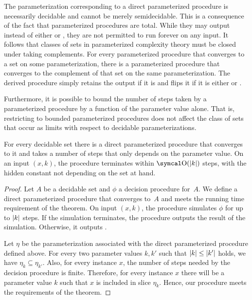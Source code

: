 The parameterization corresponding to a direct parameterized procedure is necessarily decidable and cannot be merely semidecidable.
This is a consequence of the fact that parameterized procedures are total.
While they may output  instead of either  or , they are not permitted to run forever on any input.
It follows that classes of sets in parameterized complexity theory must be closed under taking complements.
For every parameterized procedure that converges to a set on some parameterization, there is a parameterized procedure that converges to the complement of that set on the same parameterization.
The derived procedure simply retains the output if it is  and flips it if it is either  or .

Furthermore, it is possible to bound the number of steps taken by a parameterized procedure by a function of the parameter value alone.
That is, restricting to bounded parameterized procedures does not affect the class of sets that occur as limits with respect to decidable parameterizations.

\begin{theorem}
\label{thm:slow_decidable}%
  For every decidable set there is a direct parameterized procedure that converges to it and takes a number of steps that only depends on the parameter value.
  On an input $(x, k)$, the procedure terminates within $\bigO(\length{k})$ steps, with the hidden constant not depending on the set at hand.
\end{theorem}
\begin{proof}
  Let $A$ be a decidable set and $\phi$ a decision procedure for~$A$.
  We define a direct parameterized procedure that converges to~$A$ and meets the running time requirement of the theorem.
  On input $(x, k)$, the procedure simulates $\phi$ for up to ${\lvert k\rvert}$ steps.
  If the simulation terminates, the procedure outputs the result of the simulation.
  Otherwise, it outputs .

  Let $\eta$ be the parameterization associated with the direct parameterized procedure defined above.
  For every two parameter values $k, k'$ such that ${\lvert k\rvert} \le {\lvert k'\rvert}$ holds, we have $\eta_k \subseteq \eta_{k'}$.
  Also, for every instance $x$, the number of steps needed by the decision procedure is finite.
  Therefore, for every instance $x$ there will be a parameter value $k$ such that $x$ is included in slice $\eta_k$.
  Hence, our procedure meets the requirements of the theorem.
\end{proof}

